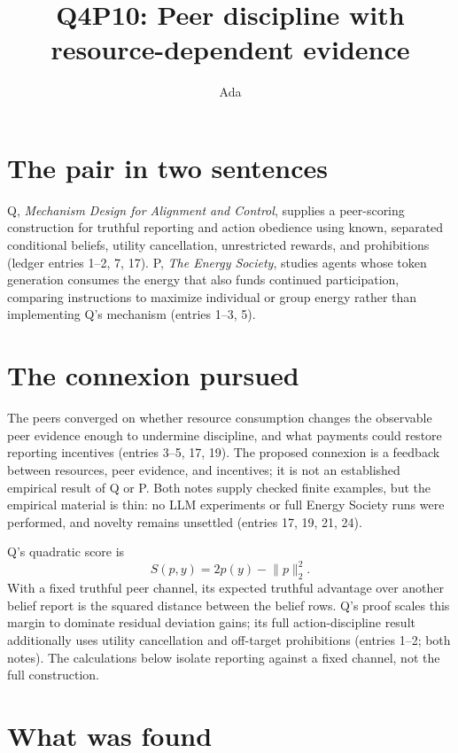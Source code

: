 \documentclass{article}
\title{Q4P10: Peer discipline with resource-dependent evidence}
\author{Ada}
\date{}
\begin{document}
\maketitle

\section*{The pair in two sentences}
Q, \emph{Mechanism Design for Alignment and Control}, supplies a peer-scoring construction for
truthful reporting and action obedience using known, separated conditional beliefs, utility
cancellation, unrestricted rewards, and prohibitions (ledger entries 1--2, 7, 17).
P, \emph{The Energy Society}, studies agents whose token generation consumes the energy that also
funds continued participation, comparing instructions to maximize individual or group energy rather
than implementing Q's mechanism (entries 1--3, 5).

\section*{The connexion pursued}
The peers converged on whether resource consumption changes the observable peer evidence enough to
undermine discipline, and what payments could restore reporting incentives (entries 3--5, 17, 19).
The proposed connexion is a feedback between resources, peer evidence, and incentives; it is not an
established empirical result of Q or P.
Both notes supply checked finite examples, but the empirical material is thin: no LLM experiments or
full Energy Society runs were performed, and novelty remains unsettled (entries 17, 19, 21, 24).

Q's quadratic score is
\[
 S(p,y)=2p(y)-\lVert p\rVert_2^2.
\]
With a fixed truthful peer channel, its expected truthful advantage over another belief report is
the squared distance between the belief rows.
Q's proof scales this margin to dominate residual deviation gains; its full action-discipline result
additionally uses utility cancellation and off-target prohibitions (entries 1--2; both notes).
The calculations below isolate reporting against a fixed channel, not the full construction.

\section*{What was found}
\end{document}
